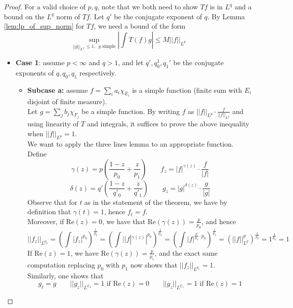       \begin{proof}
      For a valid choice of $p,q$, note that we both need to show $Tf$ is in $L^q$ and a bound on the
      $L^q$ norm of $Tf$.
      Let $q'$ be the conjugate exponent of $q$. By Lemma \ref{lem:lp_of_sup_norm} for $Tf$, we need a bound of the form
      \[ \sup_{||g||_{L^{q'}} \leq 1, \ \ g \text{ simple}} \left| \int T(f) g \right| \leq M ||f||_{L^p} \]
      \begin{itemize}
        \item{\textbf{Case 1}: assume $p<\infty$ and $q>1$, and let $q', q_0^1, q_1'$ be the conjugate exponents of $q, q_0, q_1$ respectively.
        \begin{itemize}
            \item{\textbf{Subcase a:} assume $f=\sum_i a_i \chi_{E_i}$ is a simple function (finite sum with $E_i$ disjoint of finite measure).\\
            Let $g=\sum_j b_j \chi_{F_j}$ be a simple function.
            By writing $f$ as $||f||_{L^p} \cdot \frac{f}{||f||_{L^p}}$ and using linearity of $T$ and integrals, it suffices to prove the above inequality when $||f||_{L^p}=1$.\\
            We want to apply the three lines lemma to an appropriate function. Define
            \[ \gamma(z) = p \left(\frac{1-z}{p_0} + \frac{z}{p_1} \right) \qquad f_z = |f|^{\gamma(z)} \cdot \frac{f}{|f|} \]
            \[ \delta(z) = q' \left(\frac{1-z}{q'_0} + \frac{z}{q'_1} \right) \qquad g_z = |g|^{\delta(z)} \cdot \frac{g}{|g|} \]
            Observe that for $t$ as in the statement of the theorem, we have by definition that $\gamma(t)=1$, hence $f_t=f$.\\
            Moreover, if $\mathrm{Re}(z)=0$, we have that $\mathrm{Re} (\gamma(z)) = \frac{p}{p_0}$, and hence
            \[ ||f_z||_{L^{p_0}} = \left(\int |f_z|^{p_0}\right)^{\frac{1}{p_0}} = \left(\int | |f|^{\gamma(z)} |^{p_0}\right)^{\frac{1}{p_0}} = \left(\int |f| ^{\frac{p}{p_0} \cdot p_0}\right)^{\frac{1}{p_0}} = \left(||f||_{L^p}^p\right)^{\frac{1}{p_0}} = 1^{\frac{1}{p_0}} = 1  \]
            If $\mathrm{Re}(z)=1$, we have $\mathrm{Re} (\gamma(z)) = \frac{p}{p_1}$, and the exact same computation replacing $p_0$ with $p_1$ now shows that $||f_z||_{L^{p_1}}=1$.\\
            Similarly, one shows that
            \[ g_t=g \qquad ||g_z||_{L^{q'_0}} = 1 \text{ if } \mathrm{Re}(z)=0 \qquad ||g_z||_{L^{q'_1}} = 1 \text{ if } \mathrm{Re}(z)=1 \]
}
\end{itemize}}
\end{itemize}
\end{proof}
